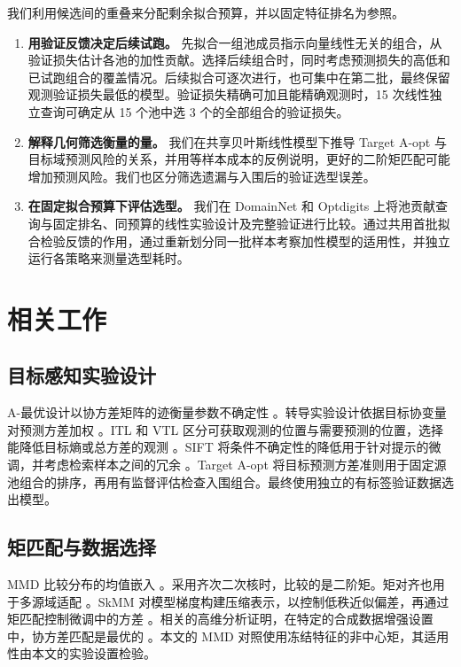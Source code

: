 \documentclass[UTF8,fontset=fandol,scheme=chinese,zihao=false,11pt,letterpaper]{ctexart}
\begin{document}
\begin{samepage}
我们利用候选间的重叠来分配剩余拟合预算，并以固定特征排名为参照。

\begin{enumerate}
\item \textbf{用验证反馈决定后续试跑。} 先拟合一组池成员指示向量线性无关的组合，从验证损失估计各池的加性贡献。选择后续组合时，同时考虑预测损失的高低和已试跑组合的覆盖情况。后续拟合可逐次进行，也可集中在第二批，最终保留观测验证损失最低的模型。验证损失精确可加且能精确观测时，15 次线性独立查询可确定从 15 个池中选 3 个的全部组合的验证损失。

\item \textbf{解释几何筛选衡量的量。} 我们在共享贝叶斯线性模型下推导 Target A-opt 与目标域预测风险的关系，并用等样本成本的反例说明，更好的二阶矩匹配可能增加预测风险。我们也区分筛选遗漏与入围后的验证选型误差。

\item \textbf{在固定拟合预算下评估选型。} 我们在 DomainNet 和 Optdigits 上将池贡献查询与固定排名、同预算的线性实验设计及完整验证进行比较。通过共用首批拟合检验反馈的作用，通过重新划分同一批样本考察加性模型的适用性，并独立运行各策略来测量选型耗时。
\end{enumerate}
\end{samepage}

\section{相关工作}
\label{sec:related}
\subsection{目标感知实验设计}
A-最优设计以协方差矩阵的迹衡量参数不确定性 \citep{fontaine2021}。转导实验设计依据目标协变量对预测方差加权 \citep{yu2006}。ITL 和 VTL 区分可获取观测的位置与需要预测的位置，选择能降低目标熵或总方差的观测 \citep{hubotter2024transductive}。SIFT 将条件不确定性的降低用于针对提示的微调，并考虑检索样本之间的冗余 \citep{hubotter2025sift}。Target A-opt 将目标预测方差准则用于固定源池组合的排序，再用有监督评估检查入围组合。最终使用独立的有标签验证数据选出模型。

\subsection{矩匹配与数据选择}
MMD 比较分布的均值嵌入 \citep{gretton2012}。采用齐次二次核时，比较的是二阶矩。矩对齐也用于多源域适配 \citep{peng2019}。SkMM 对模型梯度构建压缩表示，以控制低秩近似偏差，再通过矩匹配控制微调中的方差 \citep{dong2024skmm}。相关的高维分析证明，在特定的合成数据增强设置中，协方差匹配是最优的 \citep{rezaei2026synthetic}。本文的 MMD 对照使用冻结特征的非中心矩，其适用性由本文的实验设置检验。
\end{document}
